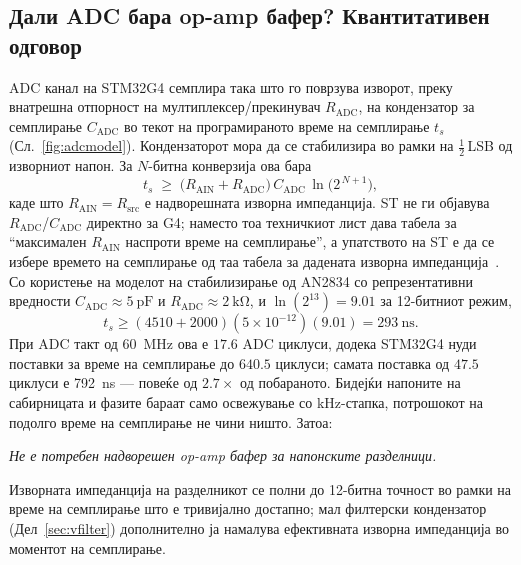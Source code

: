 \documentclass[journal,onecolumn,11pt]{IEEEtran}
\begin{document}
\subsection{Дали ADC бара op-amp бафер? Квантитативен одговор}\label{sec:buffer}
ADC канал на STM32G4 семплира така што го поврзува изворот, преку внатрешна отпорност на
мултиплексер/прекинувач \(R_{\mathrm{ADC}}\), на кондензатор за семплирање \(C_{\mathrm{ADC}}\) во
текот на програмираното време на семплирање \(t_s\) (Сл.~\ref{fig:adcmodel}). Кондензаторот мора да се
стабилизира во рамки на \(\tfrac12\,\)LSB од изворниот напон. За \(N\)-битна конверзија ова
бара~\cite{an2834,an5346}
\begin{equation}
t_s \;\ge\; \bigl(R_{\mathrm{AIN}}+R_{\mathrm{ADC}}\bigr)\,C_{\mathrm{ADC}}\,\ln\!\bigl(2^{\,N+1}\bigr),
\label{eq:settle}
\end{equation}
каде што \(R_{\mathrm{AIN}}=R_{\mathrm{src}}\) е надворешната изворна импеданција. ST не ги објавува
\(R_{\mathrm{ADC}}\)/\(C_{\mathrm{ADC}}\) директно за G4; наместо тоа техничкиот лист дава табела за
``максимален \(R_{\mathrm{AIN}}\) наспроти време на семплирање'', а упатството на ST е да се избере
времето на семплирање од таа табела за дадената изворна импеданција~\cite{an5346}. Со користење на
моделот на стабилизирање од AN2834 со репрезентативни вредности
\(C_{\mathrm{ADC}}\approx\SI{5}{\pico\farad}\) и \(R_{\mathrm{ADC}}\approx\SI{2}{\kilo\ohm}\), и
\(\ln(2^{13})=9.01\) за 12-битниот режим,
\begin{equation}
t_s \ge (4510+2000)(5\times10^{-12})(9.01)=\SI{293}{\nano\second}.
\end{equation}
При ADC такт од \SI{60}{\mega\hertz} ова е \(17.6\) ADC циклуси, додека STM32G4 нуди поставки за време
на семплирање до \(640.5\) циклуси; самата поставка од \(47.5\) циклуси е \SI{792}{\nano\second} ---
повеќе од \(2.7\times\) од побараното. Бидејќи напоните на сабирницата и фазите бараат само освежување
со kHz-стапка, потрошокот на подолго време на семплирање не чини ништо. Затоа:
\begin{center}
\emph{Не е потребен надворешен op-amp бафер за напонските разделници.}
\end{center}
Изворната импеданција на разделникот се полни до 12-битна точност во рамки на време на семплирање што
е тривијално достапно; мал филтерски кондензатор (Дел~\ref{sec:vfilter}) дополнително ја намалува
ефективната изворна импеданција во моментот на семплирање.
\end{document}
